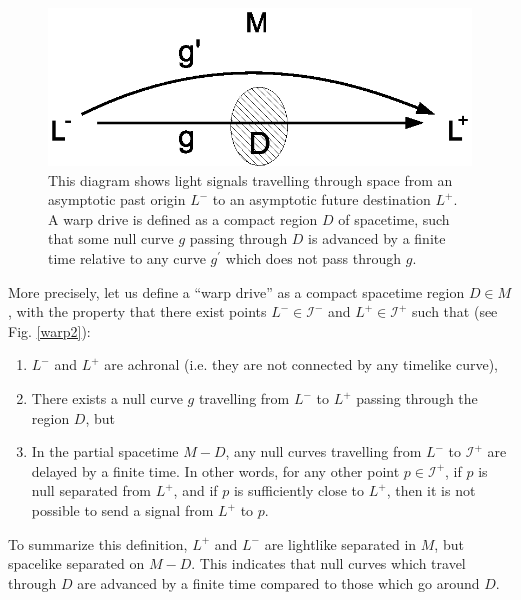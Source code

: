 \documentclass[12pt]{article}
\begin{document}
\begin{figure}[ht]
\centering
\includegraphics[width=.7\textwidth]{warp1.eps}
\caption{\small{
This diagram shows light signals travelling through space from an asymptotic past origin $L^-$ to an asymptotic future destination $L^+$.  A warp drive is defined as a compact region $D$ of spacetime, such that some null curve $g$ passing through $D$ is advanced by a finite time relative to any curve $g^\prime$ which does not pass through $g$.
}}\label{warp1}
\end{figure}

More precisely, let us define a ``warp drive'' as a compact spacetime region $D \in M$, with the property that there exist points $L^- \in \mathcal{I}^-$ and $L^+ \in \mathcal{I}^+$ such that (see Fig. \ref{warp2}):
\begin{enumerate}
\item $L^-$ and $L^+$ are achronal (i.e. they are not connected by any timelike curve), 
\item There exists a null curve $g$ travelling from $L^-$ to $L^+$ passing through the region $D$, but 
\item In the partial spacetime $M - D$, any null curves travelling from $L^-$ to $\mathcal{I}^+$ are delayed by a finite time.  In other words, for any other point $p \in \mathcal{I}^+$, if $p$ is null separated from $L^+$, and if $p$ is sufficiently close to $L^+$, then it is not possible to send a signal from $L^+$ to $p$. 
\end{enumerate}
To summarize this definition, $L^+$ and $L^-$ are lightlike separated in $M$, but spacelike separated on $M - D$.  This indicates that null curves which travel through $D$ are advanced by a finite time compared to those which go around $D$.
\end{document}
